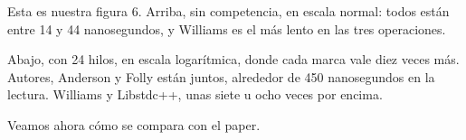 Esta es nuestra figura 6. Arriba, sin competencia, en escala normal: todos están entre 14 y 44 nanosegundos, y Williams es el más lento en las tres operaciones.

Abajo, con 24 hilos, en escala logarítmica, donde cada marca vale diez veces más. Autores, Anderson y Folly están juntos, alrededor de 450 nanosegundos en la lectura. Williams y Libstdc++, unas siete u ocho veces por encima.

Veamos ahora cómo se compara con el paper.
